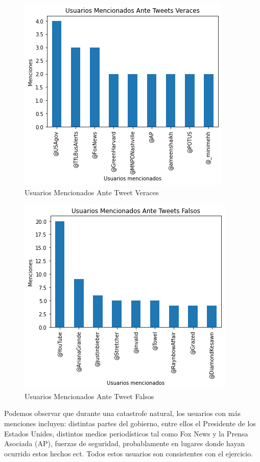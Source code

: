 \documentclass[]{article}
\begin{document}
 \begin{figure}[H]
	
	\includegraphics[width=0.70\linewidth]{arroba}
 	\caption[]{Usuarios Mencionados Ante Tweet Veraces}
\end{figure}
 \begin{figure}[H]
	
	\includegraphics[width=0.70\linewidth]{arroba2}
 	\caption[]{Usuarios Mencionados Ante Tweet Falsos}
\end{figure}

Podemos observar que durante una catastrofe natural, los usuarios con m\'as menciones incluyen: distintas partes del gobierno, entre ellos el Presidente de los Estados Unides, distintos medios period\'isticos tal como Fox News y la Prensa Asociada (AP), fuerzas de seguridad, probablamente en lugares donde hayan ocurrido estos hechos ect. Todos estos usuarios son consistentes con el ejercicio. \\
\end{document}
